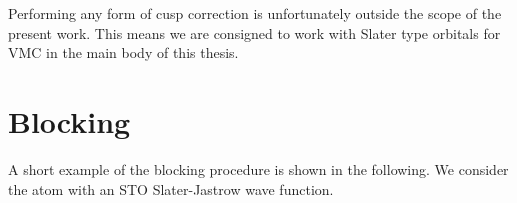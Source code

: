 \documentclass[../../master.tex]{subfiles}
\begin{document}
Performing any form of cusp correction is unfortunately outside the scope of the present work. This means we are consigned to work with Slater type orbitals for VMC in the main body of this thesis.






\section{Blocking}
A short example of the blocking procedure is shown in the following. We consider the  atom with an STO Slater-Jastrow wave function. 
\end{document}
